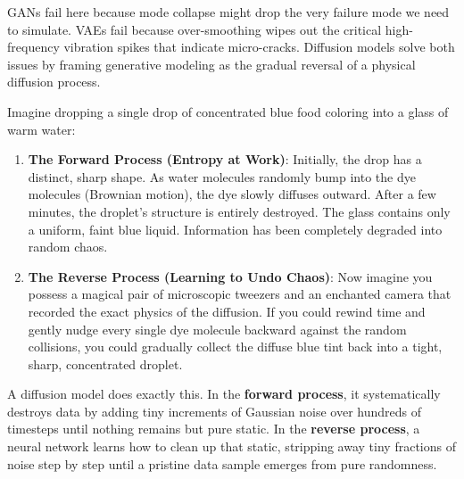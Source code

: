 GANs fail here because mode collapse might drop the very failure mode we need to simulate. VAEs fail because over-smoothing wipes out the critical high-frequency vibration spikes that indicate micro-cracks. Diffusion models solve both issues by framing generative modeling as the gradual reversal of a physical diffusion process.

\begin{analogy}
Imagine dropping a single drop of concentrated blue food coloring into a glass of warm water:
\begin{enumerate}
    \item \textbf{The Forward Process (Entropy at Work)}: Initially, the drop has a distinct, sharp shape. As water molecules randomly bump into the dye molecules (Brownian motion), the dye slowly diffuses outward. After a few minutes, the droplet's structure is entirely destroyed. The glass contains only a uniform, faint blue liquid. Information has been completely degraded into random chaos.
    \item \textbf{The Reverse Process (Learning to Undo Chaos)}: Now imagine you possess a magical pair of microscopic tweezers and an enchanted camera that recorded the exact physics of the diffusion. If you could rewind time and gently nudge every single dye molecule backward against the random collisions, you could gradually collect the diffuse blue tint back into a tight, sharp, concentrated droplet.
\end{enumerate}
A diffusion model does exactly this. In the \textbf{forward process}, it systematically destroys data by adding tiny increments of Gaussian noise over hundreds of timesteps until nothing remains but pure static. In the \textbf{reverse process}, a neural network learns how to clean up that static, stripping away tiny fractions of noise step by step until a pristine data sample emerges from pure randomness.
\end{analogy}

